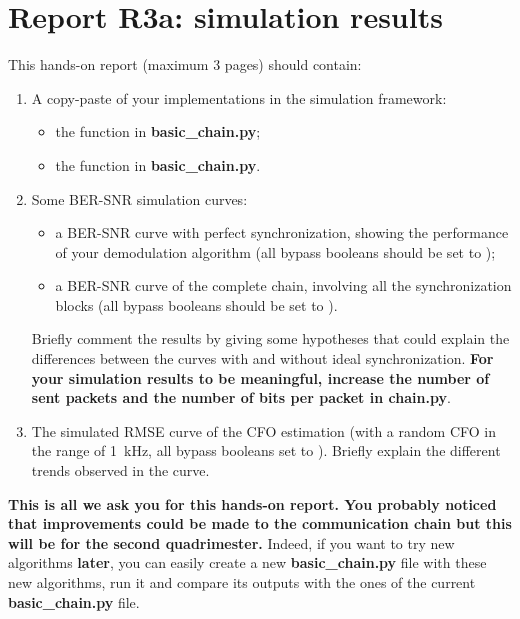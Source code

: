\section{Report R3a: simulation results}
This hands-on report (maximum 3 pages) should contain:
\begin{enumerate}
    \item A copy-paste of your implementations in the simulation framework:
    \begin{itemize}
        \item the  function in \textbf{basic\_chain.py};
        \item the  function in \textbf{basic\_chain.py}.
    \end{itemize}
    \item Some BER-SNR simulation curves:
    \begin{itemize}
        \item a BER-SNR curve with perfect synchronization, showing the performance of your demodulation algorithm (all bypass booleans should be set to );
        \item a BER-SNR curve of the complete chain, involving all the synchronization blocks (all bypass booleans should be set to ).
    \end{itemize}
    Briefly comment the results by giving some hypotheses that could explain the differences between the curves with and without ideal synchronization. \textbf{For your simulation results to be meaningful, increase the number of sent packets and the number of bits per packet in \textbf{chain.py}}.
\item The simulated RMSE curve of the CFO estimation (with a random CFO in the range of \SI{1}{\kilo\hertz}, all bypass booleans set to ). Briefly explain the different trends observed in the curve.
\end{enumerate}

\textbf{This is all we ask you for this hands-on report. You probably noticed that improvements could be made to the communication chain but this will be for the second quadrimester.} Indeed, if you want to try new algorithms \textbf{later}, you can easily create a new \textbf{basic\_chain.py} file with these new algorithms, run it and compare its outputs with the ones of the current \textbf{basic\_chain.py} file.



